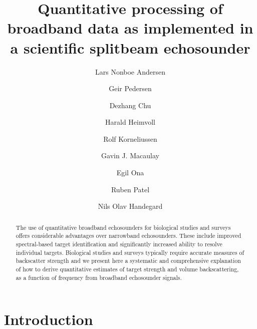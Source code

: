 \documentclass[preprint,12pt,TurnOnLineNumbers]{JASAnew}
\begin{document}
\title[]{Quantitative processing of broadband data as implemented in a scientific splitbeam echosounder}

\author{Lars Nonboe Andersen}

\author{Geir Pedersen}

\author{Dezhang Chu}

\author{Harald Heimvoll}

\author{Rolf Korneliussen}
\author{Gavin J. Macaulay}
\author{Egil Ona}

\author{Ruben Patel}

\author{Nils Olav Handegard}


\begin{abstract}
The use of quantitative broadband echosounders for biological studies and surveys offers considerable advantages over narrowband echosounders. These include improved spectral-based target identification and significantly increased ability to resolve individual targets. Biological studies and surveys typically require accurate measures of backscatter strength and we present here a systematic and comprehensive explanation of how to derive quantitative estimates of target strength and volume backscattering, as a function of frequency from broadband echosounder signals.

\end{abstract}

\maketitle


\section{Introduction}
\end{document}
